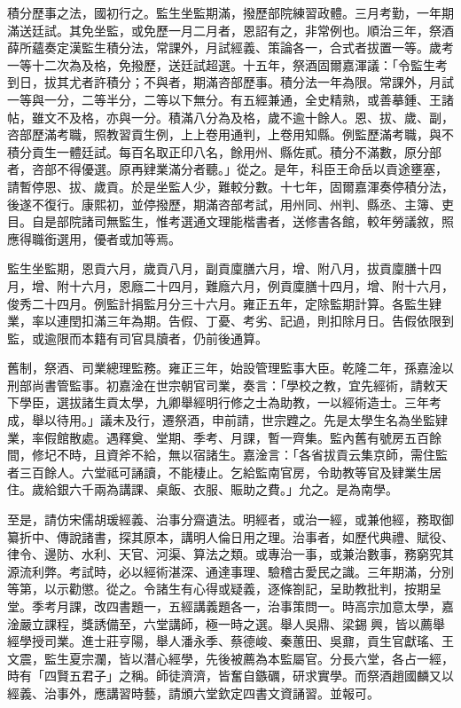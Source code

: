 \begin{pinyinscope}
積分歷事之法，國初行之。監生坐監期滿，撥歷部院練習政體。三月考勤，一年期滿送廷試。其免坐監，或免歷一月二月者，恩詔有之，非常例也。順治三年，祭酒薛所蘊奏定漢監生積分法，常課外，月試經義、策論各一，合式者拔置一等。歲考一等十二次為及格，免撥歷，送廷試超選。十五年，祭酒固爾嘉渾議：「令監生考到日，拔其尤者許積分；不與者，期滿咨部歷事。積分法一年為限。常課外，月試一等與一分，二等半分，二等以下無分。有五經兼通，全史精熟，或善摹鍾、王諸帖，雖文不及格，亦與一分。積滿八分為及格，歲不逾十餘人。恩、拔、歲、副，咨部歷滿考職，照教習貢生例，上上卷用通判，上卷用知縣。例監歷滿考職，與不積分貢生一體廷試。每百名取正印八名，餘用州、縣佐貳。積分不滿數，原分部者，咨部不得優選。原再肄業滿分者聽。」從之。是年，科臣王命岳以貢途壅塞，請暫停恩、拔、歲貢。於是坐監人少，難較分數。十七年，固爾嘉渾奏停積分法，後遂不復行。康熙初，並停撥歷，期滿咨部考試，用州同、州判、縣丞、主簿、吏目。自是部院諸司無監生，惟考選通文理能楷書者，送修書各館，較年勞議敘，照應得職銜選用，優者或加等焉。

監生坐監期，恩貢六月，歲貢八月，副貢廩膳六月，增、附八月，拔貢廩膳十四月，增、附十六月，恩廕二十四月，難廕六月，例貢廩膳十四月，增、附十六月，俊秀二十四月。例監計捐監月分三十六月。雍正五年，定除監期計算。各監生肄業，率以連閏扣滿三年為期。告假、丁憂、考劣、記過，則扣除月日。告假依限到監，或逾限而本籍有司官具牘者，仍前後通算。

舊制，祭酒、司業總理監務。雍正三年，始設管理監事大臣。乾隆二年，孫嘉淦以刑部尚書管監事。初嘉淦在世宗朝官司業，奏言：「學校之教，宜先經術，請敕天下學臣，選拔諸生貢太學，九卿舉經明行修之士為助教，一以經術造士。三年考成，舉以待用。」議未及行，遷祭酒，申前請，世宗韙之。先是太學生名為坐監肄業，率假館散處。遇釋奠、堂期、季考、月課，暫一齊集。監內舊有號房五百餘間，修圮不時，且資斧不給，無以宿諸生。嘉淦言：「各省拔貢云集京師，需住監者三百餘人。六堂祗可誦讀，不能棲止。乞給監南官房，令助教等官及肄業生居住。歲給銀六千兩為講課、桌飯、衣服、賑助之費。」允之。是為南學。

至是，請仿宋儒胡瑗經義、治事分齋遺法。明經者，或治一經，或兼他經，務取御纂折中、傳說諸書，探其原本，講明人倫日用之理。治事者，如歷代典禮、賦役、律令、邊防、水利、天官、河渠、算法之類。或專治一事，或兼治數事，務窮究其源流利弊。考試時，必以經術湛深、通達事理、驗稽古愛民之識。三年期滿，分別等第，以示勸懲。從之。令諸生有心得或疑義，逐條劄記，呈助教批判，按期呈堂。季考月課，改四書題一，五經講義題各一，治事策問一。時高宗加意太學，嘉淦嚴立課程，獎誘備至，六堂講師，極一時之選。舉人吳鼎、梁錫興，皆以薦舉經學授司業。進士莊亨陽，舉人潘永季、蔡德峻、秦蕙田、吳鼐，貢生官獻瑤、王文震，監生夏宗瀾，皆以潛心經學，先後被薦為本監屬官。分長六堂，各占一經，時有「四賢五君子」之稱。師徒濟濟，皆奮自鏃礪，研求實學。而祭酒趙國麟又以經義、治事外，應講習時藝，請頒六堂欽定四書文資誦習。並報可。


\end{pinyinscope}
